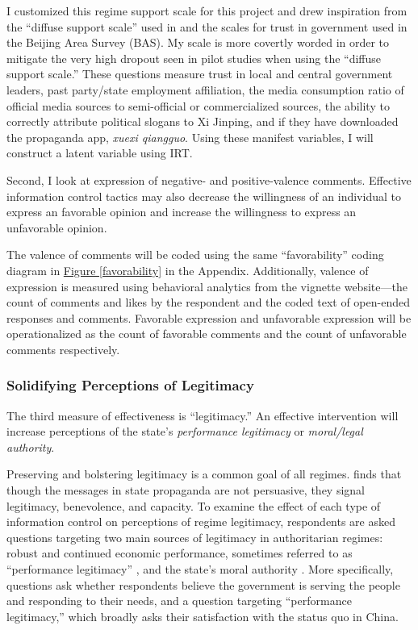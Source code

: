 \documentclass[11pt]{article}
\begin{document}
I customized this regime support scale for this project and drew inspiration from the ``diffuse support scale'' used in \cite{wang2018corruption} and the scales for trust in government used in the Beijing Area Survey (BAS). My scale is more covertly worded in order to mitigate the very high dropout seen in pilot studies when using the ``diffuse support scale.'' These questions measure trust in local and central government leaders, past party/state employment affiliation, the media consumption ratio of official media sources to semi-official or commercialized sources, the ability to correctly attribute political slogans to Xi Jinping, and if they have downloaded the propaganda app, {\it xuexi qiangguo}. Using these manifest variables, I will construct a latent variable using IRT.

Second, I look at expression of negative- and positive-valence comments. Effective information control tactics may also decrease the willingness of an individual to express an favorable opinion and increase the willingness to express an unfavorable opinion.

The valence of comments will be coded using the same ``favorability'' coding diagram in \hyperref[favorability]{Figure \ref*{favorability}} in the Appendix. Additionally, valence of expression is measured using behavioral analytics from the vignette website---the count of comments and likes by the respondent and the coded text of open-ended responses and comments. Favorable expression and unfavorable expression will be operationalized as the count of favorable comments and the count of unfavorable comments respectively.

\subsubsection{Solidifying Perceptions of Legitimacy}

The third measure of effectiveness is ``legitimacy.'' An effective intervention will increase perceptions of the state's {\it performance legitimacy} or {\it moral/legal authority}.

Preserving and bolstering legitimacy is a common goal of all regimes. \cite{huang2014propaganda} finds that though the messages in state propaganda are not persuasive, they signal legitimacy, benevolence, and capacity. To examine the effect of each type of information control on perceptions of regime legitimacy, respondents are asked questions targeting two main sources of legitimacy in authoritarian regimes: robust and continued economic performance, sometimes referred to as ``performance legitimacy'' \citep{bueno2005development, zhao2009mandate}, and the state's moral authority \citep{ding2019justice,grzymala2015nations}. More specifically, questions ask whether respondents believe the government is serving the people and responding to their needs, and a question targeting ``performance legitimacy,'' which broadly asks their satisfaction with the status quo in China.
\end{document}
